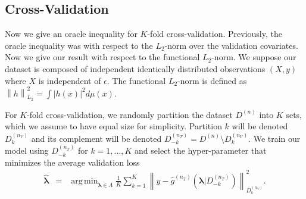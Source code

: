 \documentclass[12pt]{article} %
\theoremstyle{definition}
\DeclareMathOperator*{\argmin}{arg\,min}
\begin{document}
\subsection{Cross-Validation}\label{sec:cv}

Now we give an oracle inequality for $K$-fold cross-validation.
Previously, the oracle inequality was with respect to the $L_2$-norm over the validation covariates.
Now we give our result with respect to the functional $L_2$-norm.
We suppose our dataset is composed of independent identically distributed observations $(X,y)$ where $X$ is independent of $\epsilon$.
The functional $L_2$-norm is defined as
$
\left \| h \right \|^2_{L_2} = \int \left |h(x) \right |^2 d\mu(x)
$.

For $K$-fold cross-validation, we randomly partition the dataset $D^{(n)}$ into $K$ sets, which we assume to have equal size for simplicity. Partition $k$ will be denoted $D_k^{(n_V)}$ and its complement will be denoted $D_{-k}^{(n_T)} = D^{(n)} \setminus D_k^{(n_V)}$. We train our model using $D_{-k}^{(n_T)}$ for $k=1,...,K$ and select the hyper-parameter that minimizes the average validation loss
\begin{eqnarray}
\label{kfold_opt}
\hat{\boldsymbol \lambda} &=& \argmin_{\boldsymbol{\lambda} \in\Lambda} \frac{1}{K} \sum_{k=1}^K  \left \| y-\hat{g}^{(n_T)}(\boldsymbol \lambda | D_{-k}^{(n_T)}) \right \|_{D_k^{(n_V)}}^{2}.
\end{eqnarray}
\end{document}

